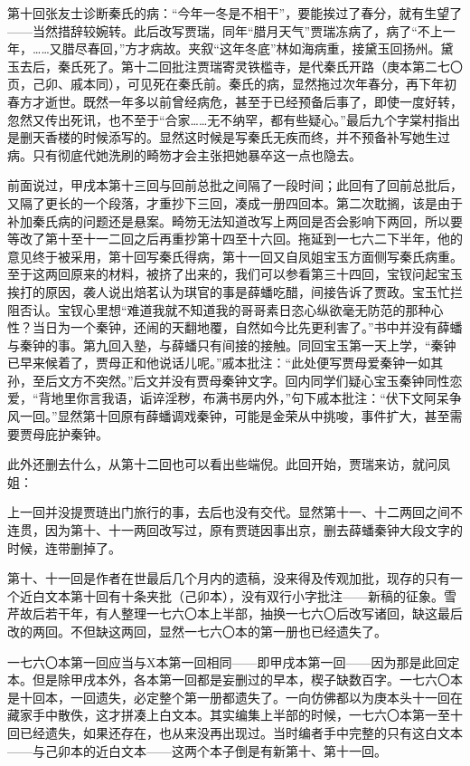 \par 第十回张友士诊断秦氏的病：“今年一冬是不相干”，要能挨过了春分，就有生望了——当然措辞较婉转。此后改写贾瑞，同年“腊月天气”贾瑞冻病了，病了“不上一年，……又腊尽春回，”方才病故。夹叙“这年冬底”林如海病重，接黛玉回扬州。黛玉去后，秦氏死了。第十二回批注贾瑞寄灵铁槛寺，是代秦氏开路（庚本第二七〇页，己卯、戚本同），可见死在秦氏前。秦氏的病，显然拖过次年春分，再下年初春方才逝世。既然一年多以前曾经病危，甚至于已经预备后事了，即使一度好转，忽然又传出死讯，也不至于“合家……无不纳罕，都有些疑心。”最后九个字棠村指出是删天香楼的时候添写的。显然这时候是写秦氏无疾而终，并不预备补写她生过病。只有彻底代她洗刷的畸笏才会主张把她暴卒这一点也隐去。
\par 前面说过，甲戌本第十三回与回前总批之间隔了一段时间；此回有了回前总批后，又隔了更长的一个段落，才重抄下三回，凑成一册四回本。第二次耽搁，该是由于补加秦氏病的问题还是悬案。畸笏无法知道改写上两回是否会影响下两回，所以要等改了第十至十一二回之后再重抄第十四至十六回。拖延到一七六二下半年，他的意见终于被采用，第十回写秦氏得病，第十一回又自凤姐宝玉方面侧写秦氏病重。至于这两回原来的材料，被挤了出来的，我们可以参看第三十四回，宝钗问起宝玉挨打的原因，袭人说出焙茗认为琪官的事是薛蟠吃醋，间接告诉了贾政。宝玉忙拦阻否认。宝钗心里想“难道我就不知道我的哥哥素日恣心纵欲毫无防范的那种心性？当日为一个秦钟，还闹的天翻地覆，自然如今比先更利害了。”书中并没有薛蟠与秦钟的事。第九回入塾，与薛蟠只有间接的接触。同回宝玉第一天上学，“秦钟已早来候着了，贾母正和他说话儿呢。”戚本批注：“此处便写贾母爱秦钟一如其孙，至后文方不突然。”后文并没有贾母秦钟文字。回内同学们疑心宝玉秦钟同性恋爱，“背地里你言我语，诟谇淫秽，布满书房内外，”句下戚本批注：“伏下文阿呆争风一回。”显然第十回原有薛蟠调戏秦钟，可能是金荣从中挑唆，事件扩大，甚至需要贾母庇护秦钟。
\par 此外还删去什么，从第十二回也可以看出些端倪。此回开始，贾瑞来访，就问凤姐：
\par 上一回并没提贾琏出门旅行的事，去后也没有交代。显然第十一、十二两回之间不连贯，因为第十、十一两回改写过，原有贾琏因事出京，删去薛蟠秦钟大段文字的时候，连带删掉了。
\par 第十、十一回是作者在世最后几个月内的遗稿，没来得及传观加批，现存的只有一个近白文本第十回有十条夹批（己卯本），没有双行小字批注——新稿的征象。雪芹故后若干年，有人整理一七六〇本上半部，抽换一七六〇后改写诸回，缺这最后改的两回。不但缺这两回，显然一七六〇本的第一册也已经遗失了。
\par 一七六〇本第一回应当与X本第一回相同——即甲戌本第一回——因为那是此回定本。但是除甲戌本外，各本第一回都是妄删过的早本，楔子缺数百字。一七六〇本是十回本，一回遗失，必定整个第一册都遗失了。一向仿佛都以为庚本头十一回在藏家手中散佚，这才拼凑上白文本。其实编集上半部的时候，一七六〇本第一至十回已经遗失，如果还存在，也从来没再出现过。当时编者手中完整的只有这白文本——与己卯本的近白文本——这两个本子倒是有新第十、第十一回。
